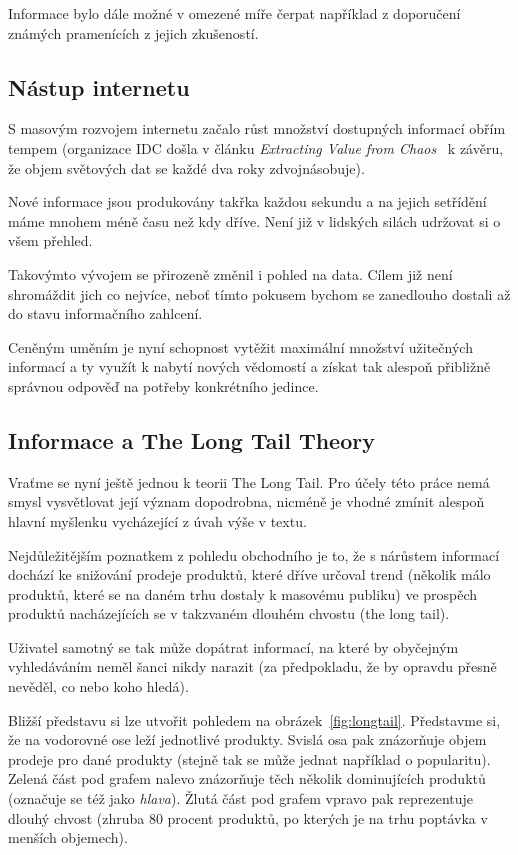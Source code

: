 \documentclass[thesis=M,czech]{FITthesis}[2014/05/07]
\begin{document}
\begin{introduction}
	Informace bylo dále možné v omezené míře čerpat například z doporučení známých pramenících z jejich zkušeností.

\subsection{Nástup internetu}		
	S masovým rozvojem internetu začalo růst množství dostupných informací obřím tempem (organizace IDC došla v článku \emph{Extracting Value from Chaos}~\cite{digitaluniverse} k závěru, že objem světových dat se každé dva roky zdvojnásobuje).
	
	Nové informace jsou produkovány takřka každou sekundu a na jejich setřídění máme mnohem méně času než kdy dříve. Není již v lidských silách udržovat si o všem přehled.
	
	Takovýmto vývojem se přirozeně změnil i pohled na data. Cílem již není shromáždit jich co nejvíce, neboť tímto pokusem bychom se zanedlouho dostali až do stavu informačního zahlcení.
	
	Ceněným uměním je nyní schopnost vytěžit maximální množství užitečných informací a ty využít k nabytí nových vědomostí a získat tak alespoň přibližně správnou odpověď na potřeby konkrétního jedince.
	
\subsection{Informace a The Long Tail Theory}	
	\label{sub:ltl}
	Vraťme se nyní ještě jednou k teorii The Long Tail. Pro účely této práce nemá smysl vysvětlovat její význam dopodrobna, nicméně je vhodné zmínit alespoň hlavní myšlenku vycházející z úvah výše v textu.
	
	Nejdůležitějším poznatkem z pohledu obchodního je to, že s nárůstem informací dochází ke snižování prodeje produktů, které dříve určoval trend (několik málo produktů, které se na daném trhu dostaly k masovému publiku) ve prospěch produktů nacházejících se v takzvaném dlouhém chvostu (the long tail).
	
	Uživatel samotný se tak může dopátrat informací, na které by obyčejným vyhledáváním neměl šanci nikdy narazit (za předpokladu, že by opravdu přesně nevěděl, co nebo koho hledá).
	
	Bližší představu si lze utvořit pohledem na obrázek~\ref{fig:longtail}. Představme si, že na vodorovné ose leží jednotlivé produkty. Svislá osa pak znázorňuje objem prodeje pro dané produkty (stejně tak se může jednat například o popularitu). Zelená část pod grafem nalevo znázorňuje těch několik dominujících produktů (označuje se též jako \emph{hlava}). Žlutá část pod grafem vpravo pak reprezentuje dlouhý chvost (zhruba 80 procent produktů, po kterých je na trhu poptávka v menších objemech).
	

\end{introduction}
\end{document}

